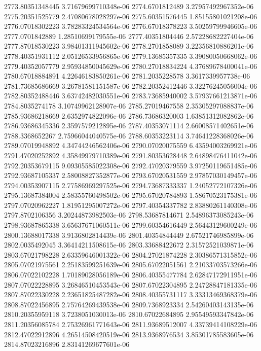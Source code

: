 {2773.80351348445 3.71679699710348e-06
2774.6701812489 3.27957492967352e-06
2775.20351525779 2.47080678028297e-06
2775.60351576445 1.85155801021208e-06
2776.07018302223 3.78283324534564e-06
2776.67018378223 3.50259799946605e-06
2777.0701842889 1.28510699179555e-06
2777.40351804446 2.57228682227404e-06
2777.87018530223 3.98401311945602e-06
2778.2701858089 3.22356810886201e-06
2778.40351931112 2.05126533956865e-06
2779.13685357335 3.39080050668062e-06
2779.40352057779 2.95934850045629e-06
2780.27018834224 4.37689678400041e-06
2780.67018884891 4.22646183850261e-06
2781.2035228578 3.3617339957738e-06
2781.73685686669 3.26781581151587e-06
2782.20352412446 3.32276245056004e-06
2782.80352488446 3.63742482030551e-06
2783.73685940002 3.57937661213871e-06
2784.8035274178 3.10749962128907e-06
2785.27019467558 2.35305297088837e-06
2785.93686218669 2.6352974822096e-06
2786.73686320003 1.63851312082862e-06
2786.93686345336 2.3597579212895e-06
2787.40353071114 2.66008571402651e-06
2788.3368652267 2.75966044040575e-06
2788.60353223114 3.74641228368026e-06
2789.07019948892 4.34744246562406e-06
2790.07020075559 6.43594003269921e-06
2791.47020252892 4.35849979710389e-06
2791.80353628448 2.64898476411042e-06
2792.20353679115 9.09305585022308e-06
2792.47020379559 3.97250119651485e-06
2792.93687105337 2.58008827352877e-06
2793.67020531559 2.97857030149457e-06
2794.00353907115 2.77586969297525e-06
2794.73687333337 1.24052772107326e-06
2795.13687384004 2.58355760498502e-06
2795.67020784893 1.58670523175381e-06
2797.07020962227 1.81951295007272e-06
2797.40354337782 2.83880261140308e-06
2797.8702106356 3.20244873982503e-06
2798.53687814671 2.54896373085243e-06
2798.93687865338 3.65637671060511e-06
2799.60354616449 2.56443129600249e-06
2800.13688017338 3.9136802814439e-06
2801.40354844449 2.67521746985899e-06
2802.0035492045 3.36414211508615e-06
2803.33688422672 2.31572521039871e-06
2803.67021798228 2.63359646001322e-06
2804.27021874228 2.30386571315852e-06
2805.07021975561 2.25183599251639e-06
2805.67022051561 2.21033703573266e-06
2806.07022102228 1.70189028056189e-06
2806.40355477784 2.62847172911951e-06
2807.07022228895 3.26846510453543e-06
2807.67022304895 2.24728847181335e-06
2807.87022330228 2.23651825487282e-06
2808.40355731117 3.33313469368379e-06
2808.87022456895 2.75764269439538e-06
2809.7368923334 2.54260403143135e-06
2810.20355959118 3.7238051030013e-06
2810.67022684895 2.95549593347842e-06
2811.20356085784 2.75326961771643e-06
2811.93689512007 4.33739414108229e-06
2812.47022912896 4.26514508420519e-06
2813.9368976534 3.85301785583605e-06
2814.87023216896 2.83141269677601e-06
}

